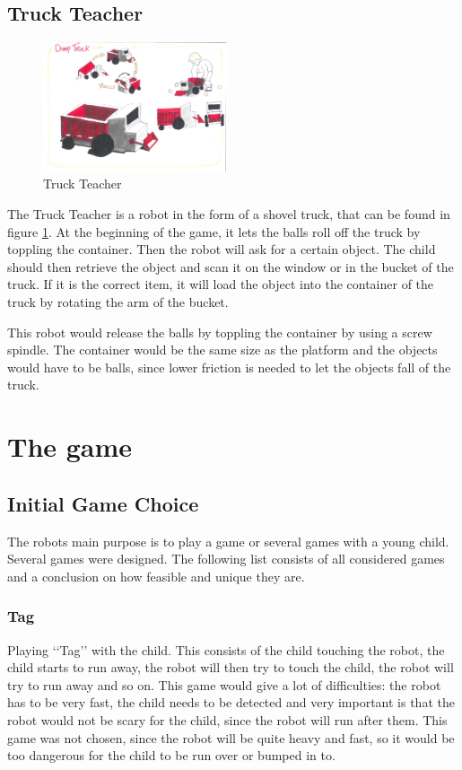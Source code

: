 \documentclass[11pt,twoside,a4paper]{report}
\begin{document}
\section{Truck Teacher}
\begin{figure}
  \begin{center}
    \includegraphics[width=0.48\textwidth]{Images/TruckTeacherConcept.pdf}
  \end{center}
  \caption{Truck Teacher}
  \label{figure:truckteacher}
\end{figure}
The Truck Teacher is a robot in the form of a shovel truck, that can be found in figure \ref{figure:truckteacher}. At the beginning of the game, it lets the balls roll off the truck by toppling the container. Then the robot will ask for a certain object. The child should then retrieve the object and scan it on the window or in the bucket of the truck. If it is the correct item, it will load the object into the container of the truck by rotating the arm of the bucket.

This robot would release the balls by toppling the container by using a screw spindle. The container would be the same size as the platform and the objects would have to be balls, since lower friction is needed to let the objects fall of the truck.

\chapter{The game}
\label{chap:games}

\section{Initial Game Choice}
The robots main purpose is to play a game or several games with a young child. Several games were designed. The following list consists of all considered games and a conclusion on how feasible and unique they are.
\subsection{Tag}
Playing \lq\lq{}Tag\rq\rq{} with the child. This consists of the child touching the robot, the child starts to run away, the robot will then try to touch the child, the robot will try to run away and so on.
This game would give a lot of difficulties: the robot has to be very fast, the child needs to be detected and very important is that the robot would not be scary for the child, since the robot will run after them. This game was not chosen, since the robot will be quite heavy and fast, so it would be too dangerous for the child to be run over or bumped in to.
\end{document}
